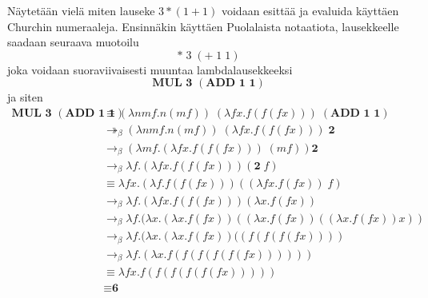 \begin{esim}
Näytetään vielä miten lauseke $3 * (1+1)$ voidaan esittää ja evaluida käyttäen Churchin numeraaleja. Ensinnäkin käyttäen Puolalaista notaatiota, lausekkeelle saadaan seuraava muotoilu
\[* \; 3 \; (+ \; 1 \; 1) \] 
joka voidaan suoraviivaisesti muuntaa lambdalausekkeeksi
\[ \textbf{MUL 3 }(\textbf{ADD 1 1}) \]
ja siten
\begin{align*}
\textbf{MUL 3 }(\textbf{ADD 1 1}) &\equiv (\lambda n m f . n (mf))  \; (\lambda f x . f(f(fx))) \;(\textbf{ADD 1 1}) \\
&\twoheadrightarrow_{\beta} (\lambda n m f . n (mf) ) \; (\lambda f x . f(f(fx))) \; \textbf{2} \\
&\rightarrow_{\beta} (\lambda m f . (\lambda f x . f(f(fx))) \; (m f)) \textbf{2}    \\
&\rightarrow_{\beta} \lambda f . (\lambda f x . f(f(fx))) (\textbf{2} \; f) \\
&\equiv \lambda f x . (\lambda f . f(f(fx))) ((\lambda f x . f (f x)) \; f) \\
&\rightarrow_{\beta} \lambda f . (\lambda f x .  f(f(fx))) (\lambda x . f (f x)) \\
&\rightarrow_{\beta} \lambda f . (\lambda x .  (\lambda x . f (f x))((\lambda x . f (f x))((\lambda x . f (f x))x))\\
&\rightarrow_{\beta} \lambda f . (\lambda x .  (\lambda x . f (f x))((f (f( f( f x))))  \\
&\rightarrow_{\beta} \lambda f . (\lambda x . f( f (f (f( f( f x)))))) \\
&\equiv \lambda f x. f( f (f (f( f( f x))))) \\
&\equiv \textbf{6}
\end{align*} 
\end{esim}   

